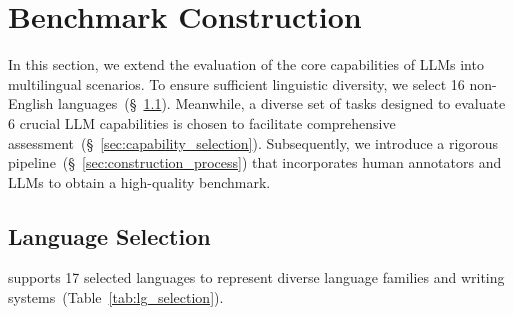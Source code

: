 \section{Benchmark Construction}
In this section, we extend the evaluation of the core capabilities of LLMs into multilingual scenarios.
To ensure sufficient linguistic diversity, we select 16 non-English languages~(\S~\ref{sec:lg_selection}).
Meanwhile, a diverse set of tasks designed to evaluate 6 crucial LLM capabilities is chosen to facilitate comprehensive assessment~(\S~\ref{sec:capability_selection}).
Subsequently, we introduce a rigorous pipeline~(\S~\ref{sec:construction_process}) that incorporates human annotators and LLMs to obtain a high-quality benchmark.


\subsection{Language Selection}
\label{sec:lg_selection}
\name supports 17 selected languages to represent diverse language families and writing systems~(Table~\ref{tab:lg_selection}).


